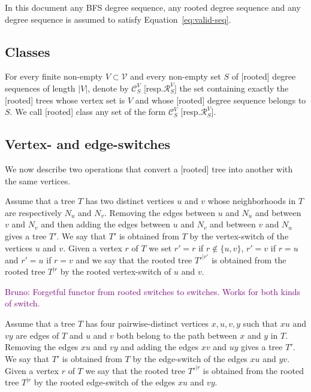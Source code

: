 \documentclass[11 pt]{modarticle}
\newcommand{\vset}{\mathcal{V}}
\newcommand{\size}[1]{|#1|}
\newcommand{\rtree}[2]{{#1}^{\lvert #2}}
\newcommand{\tclass}{\mathcal{C}}
\newcommand{\rtclass}{\mathcal{R}}
\newcommand{\pclass}[2]{\tclass^{#1}_{#2}}
\newcommand{\rpclass}[2]{\rtclass^{#1}_{#2}}
\newcommand{\bldcomment}[1]{\textcolor{purple}{{\footnotesize Bruno:} #1}}
\begin{document}
In this document any BFS degree sequence, any rooted degree sequence and any degree sequence is assumed to satisfy Equation~\eqref{eq:valid-seq}.

\subsection{Classes}

\begin{defi}
For every finite non-empty $V \subset \vset$ and every non-empty set $S$ of [rooted] degree sequences of length $\size{V}$, denote by $\pclass{V}{S}$ [resp.\@ $\rpclass{V}{S}$] the set containing exactly the [rooted] trees whose vertex set is $V$ and whose [rooted] degree sequence belongs to $S$. We call [rooted] class any set of the form $\pclass{V}{S}$ [resp.\@ $\rpclass{V}{S}$].
\end{defi}

\subsection{Vertex- and edge-switches}

We now describe two operations that convert a [rooted] tree into another with the same vertices.

\begin{defi}
Assume that a tree $T$ has two distinct vertices $u$ and $v$ whose neighborhoods in $T$ are respectively $N_u$ and $N_v$. Removing the edges between $u$ and $N_u$ and between $v$ and $N_v$ and then adding the edges between $u$ and $N_v$ and between $v$ and $N_u$ gives a tree $T'$. We say that $T'$ is obtained from $T$ by the vertex-switch of the vertices $u$ and $v$. Given a vertex $r$ of $T$ we set $r' = r$ if $r \notin \{u,v\}$, $r' = v$ if $r = u$ and $r' = u$ if $r = v$ and we say that the rooted tree $\rtree{T'}{r'}$ is obtained from the rooted tree $\rtree{T}{r}$ by the rooted vertex-switch of $u$ and $v$.
\end{defi}

\bldcomment{Forgetful functor from rooted switches to switches. Works for both kinds of switch.}



\begin{defi}
Assume that a tree $T$ has four pairwise-distinct vertices $x,u,v,y$ such that $xu$ and $vy$ are edges of $T$ and $u$ and $v$ both belong to the path between $x$ and $y$ in $T$. Removing the edges $xu$ and $vy$ and adding the edges $xv$ and $uy$ gives a tree $T'$. We say that $T'$ is obtained from $T$ by the edge-switch of the edges $xu$ and $yv$. Given a vertex $r$ of $T$ we say that the rooted tree $\rtree{T'}{r}$ is obtained from the rooted tree $\rtree{T}{r}$ by the rooted edge-switch of the edges $xu$ and $vy$.
\end{defi}
\end{document}
